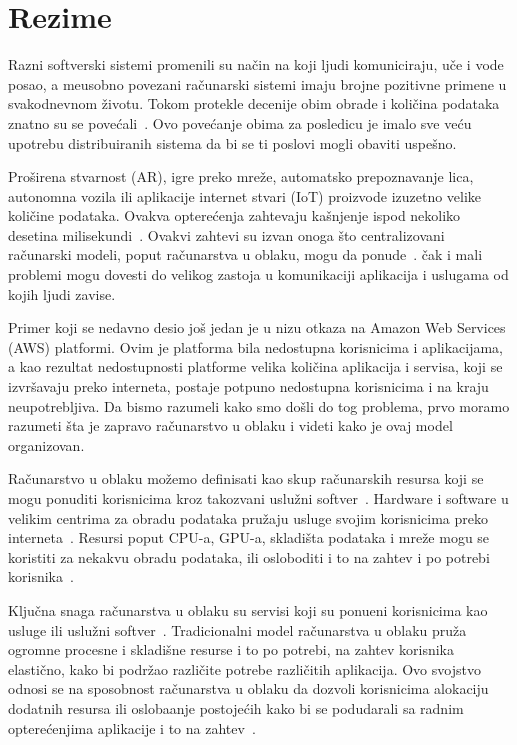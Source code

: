\chapter*{Rezime}
\pagestyle{plain}

Razni softverski sistemi promenili su na\v cin na koji ljudi komuniciraju, u\v ce i vode posao, a me\dj usobno povezani ra\v cunarski sistemi imaju brojne pozitivne primene u svakodnevnom \v zivotu. Tokom protekle decenije obim obrade i koli\v cina podataka znatno su se pove\'cali~\cite{ChiangZ16}. Ovo pove\'canje obima za posledicu je imalo sve ve\'cu upotrebu distribuiranih sistema da bi se ti poslovi mogli obaviti uspe\v sno.

Pro\v sirena stvarnost (AR), igre preko mre\v ze, automatsko prepoznavanje lica, autonomna vozila ili aplikacije internet stvari (IoT) proizvode izuzetno velike koli\v cine podataka. Ovakva optere\'cenja zahtevaju ka\v snjenje ispod nekoliko desetina milisekundi~\cite{ChiangZ16}. Ovakvi zahtevi su izvan onoga \v sto centralizovani ra\v cunarski modeli, poput ra\v cunarstva u oblaku, mogu da ponude~\cite{ChiangZ16}. \v cak i mali problemi mogu dovesti do velikog zastoja u komunikaciji aplikacija i uslugama od kojih ljudi zavise. 

Primer koji se nedavno desio jo\v s jedan je u nizu otkaza na Amazon Web Services (AWS) platformi. Ovim je platforma bila nedostupna korisnicima i aplikacijama, a kao rezultat nedostupnosti platforme velika koli\v cina aplikacija i servisa, koji se izvr\v savaju preko interneta, postaje potpuno nedostupna korisnicima i na kraju neupotrebljiva. Da bismo razumeli kako smo do\v sli do tog problema, prvo moramo razumeti \v sta je zapravo ra\v cunarstvo u oblaku i videti kako je ovaj model organizovan.

Ra\v cunarstvo u oblaku mo\v zemo definisati kao skup ra\v cunarskih resursa koji se mogu ponuditi korisnicima kroz takozvani uslu\v zni softver~\cite{Vogels}. Hardware i software u velikim centrima za obradu podataka pru\v zaju usluge svojim korisnicima preko interneta~\cite {AboveTheCloud}. Resursi poput CPU-a, GPU-a, skladi\v sta podataka i mre\v ze mogu se koristiti za nekakvu obradu podataka, ili osloboditi i to na zahtev i po potrebi korisnika~\cite {ZhangCB10}. 

Klju\v cna snaga ra\v cunarstva u oblaku su servisi koji su ponu\dj eni korisnicima kao usluge ili uslu\v zni softver~\cite{Vogels}. Tradicionalni model ra\v cunarstva u oblaku pru\v za ogromne procesne i skladi\v sne resurse i to po potrebi, na zahtev korisnika elasti\v cno, kako bi podr\v zao razli\v cite potrebe razli\v citih aplikacija.  Ovo svojstvo odnosi se na sposobnost ra\v cunarstva u oblaku da dozvoli korisnicima alokaciju dodatnih resursa ili osloba\dj anje postoje\'cih kako bi se podudarali sa radnim optere\'cenjima aplikacije i to na zahtev~\cite{AssuncaoVB18}.

